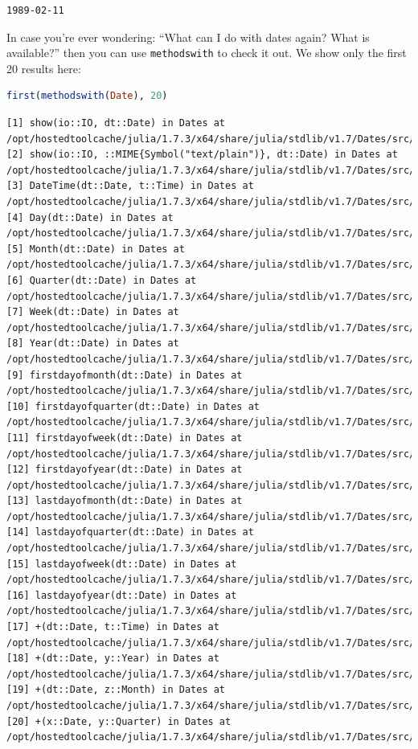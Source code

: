 \documentclass[
  notoc %
]{tufte-book}
\newcommand{\passthrough}[1]{#1}
\begin{document}
\begin{lstlisting}[language=Output]
1989-02-11
\end{lstlisting}

In case you're ever wondering: ``What can I do with dates again? What is
available?'' then you can use \passthrough{\lstinline!methodswith!} to
check it out. We show only the first 20 results here:

\begin{lstlisting}[language=Julia]
first(methodswith(Date), 20)
\end{lstlisting}

\begin{lstlisting}[language=Output]
[1] show(io::IO, dt::Date) in Dates at /opt/hostedtoolcache/julia/1.7.3/x64/share/julia/stdlib/v1.7/Dates/src/io.jl:736
[2] show(io::IO, ::MIME{Symbol("text/plain")}, dt::Date) in Dates at /opt/hostedtoolcache/julia/1.7.3/x64/share/julia/stdlib/v1.7/Dates/src/io.jl:734
[3] DateTime(dt::Date, t::Time) in Dates at /opt/hostedtoolcache/julia/1.7.3/x64/share/julia/stdlib/v1.7/Dates/src/types.jl:403
[4] Day(dt::Date) in Dates at /opt/hostedtoolcache/julia/1.7.3/x64/share/julia/stdlib/v1.7/Dates/src/periods.jl:36
[5] Month(dt::Date) in Dates at /opt/hostedtoolcache/julia/1.7.3/x64/share/julia/stdlib/v1.7/Dates/src/periods.jl:36
[6] Quarter(dt::Date) in Dates at /opt/hostedtoolcache/julia/1.7.3/x64/share/julia/stdlib/v1.7/Dates/src/periods.jl:36
[7] Week(dt::Date) in Dates at /opt/hostedtoolcache/julia/1.7.3/x64/share/julia/stdlib/v1.7/Dates/src/periods.jl:36
[8] Year(dt::Date) in Dates at /opt/hostedtoolcache/julia/1.7.3/x64/share/julia/stdlib/v1.7/Dates/src/periods.jl:36
[9] firstdayofmonth(dt::Date) in Dates at /opt/hostedtoolcache/julia/1.7.3/x64/share/julia/stdlib/v1.7/Dates/src/adjusters.jl:84
[10] firstdayofquarter(dt::Date) in Dates at /opt/hostedtoolcache/julia/1.7.3/x64/share/julia/stdlib/v1.7/Dates/src/adjusters.jl:157
[11] firstdayofweek(dt::Date) in Dates at /opt/hostedtoolcache/julia/1.7.3/x64/share/julia/stdlib/v1.7/Dates/src/adjusters.jl:52
[12] firstdayofyear(dt::Date) in Dates at /opt/hostedtoolcache/julia/1.7.3/x64/share/julia/stdlib/v1.7/Dates/src/adjusters.jl:119
[13] lastdayofmonth(dt::Date) in Dates at /opt/hostedtoolcache/julia/1.7.3/x64/share/julia/stdlib/v1.7/Dates/src/adjusters.jl:100
[14] lastdayofquarter(dt::Date) in Dates at /opt/hostedtoolcache/julia/1.7.3/x64/share/julia/stdlib/v1.7/Dates/src/adjusters.jl:180
[15] lastdayofweek(dt::Date) in Dates at /opt/hostedtoolcache/julia/1.7.3/x64/share/julia/stdlib/v1.7/Dates/src/adjusters.jl:68
[16] lastdayofyear(dt::Date) in Dates at /opt/hostedtoolcache/julia/1.7.3/x64/share/julia/stdlib/v1.7/Dates/src/adjusters.jl:135
[17] +(dt::Date, t::Time) in Dates at /opt/hostedtoolcache/julia/1.7.3/x64/share/julia/stdlib/v1.7/Dates/src/arithmetic.jl:19
[18] +(dt::Date, y::Year) in Dates at /opt/hostedtoolcache/julia/1.7.3/x64/share/julia/stdlib/v1.7/Dates/src/arithmetic.jl:27
[19] +(dt::Date, z::Month) in Dates at /opt/hostedtoolcache/julia/1.7.3/x64/share/julia/stdlib/v1.7/Dates/src/arithmetic.jl:54
[20] +(x::Date, y::Quarter) in Dates at /opt/hostedtoolcache/julia/1.7.3/x64/share/julia/stdlib/v1.7/Dates/src/arithmetic.jl:73
\end{lstlisting}
\end{document}
